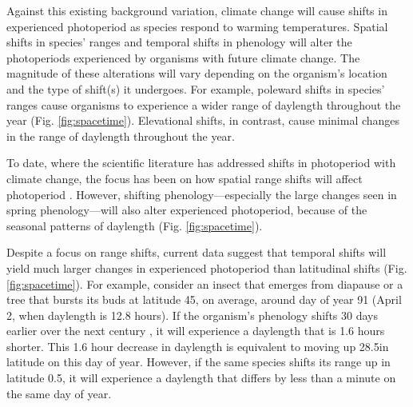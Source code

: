 \documentclass{article}
\begin{document}
\par Against this existing background variation, climate change will cause shifts in experienced photoperiod as species respond to warming temperatures. Spatial shifts in species' ranges and temporal shifts in phenology will alter the photoperiods experienced by organisms with future climate change. The magnitude of these alterations will vary depending on the organism's location and the type of shift(s) it undergoes. For example, poleward shifts in species' ranges cause organisms to experience a wider range of daylength throughout the year (Fig. \ref{fig:spacetime}). Elevational shifts, in contrast, cause minimal changes in the range of daylength throughout the year. %

\par To date, where the scientific literature has addressed shifts in photoperiod with climate change, the focus has been on how spatial range shifts will affect photoperiod \citep[e.g.,][]{saikkonen2012,way2015}. However, shifting phenology---especially the large changes seen in spring phenology---will also alter experienced photoperiod, because of the seasonal patterns of daylength (Fig. \ref{fig:spacetime}). 

\par Despite a focus on range shifts, current data suggest that temporal shifts will yield much larger changes in experienced photoperiod than latitudinal shifts (Fig. \ref{fig:spacetime}). %
For example, consider an insect that emerges from diapause or a tree that bursts its buds at latitude 45\degree, on average, around day of year 91 (April 2, when daylength is 12.8 hours). If the organism's phenology shifts 30 days earlier over the next century \citep[i.e., a rate of ~3 days per decade, as has been observed,][]{parmesan2003}, it will experience a daylength that is 1.6 hours shorter. This 1.6 hour decrease in daylength is equivalent to moving up 28.5\degree  in latitude on this day of year. However, if the same species shifts its range up in latitude 0.5\degree   \citep[i.e., 60 km over the next century,  comparable to observed rates,][]{chen2011,parmesan2003}, it will experience a daylength that differs by less than a minute on the same day of year. 
\end{document}
